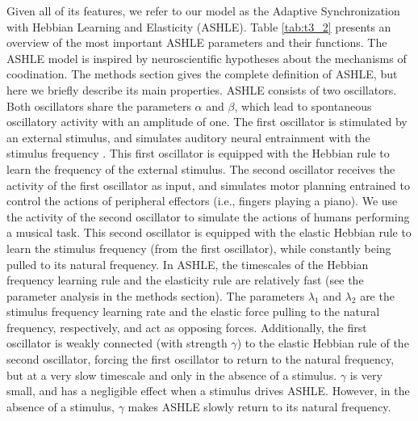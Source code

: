 \documentclass{report}
\begin{document}
Given all of its features, we refer to our model as the Adaptive Synchronization with Hebbian Learning and Elasticity (ASHLE). Table \ref{tab:t3_2} presents an overview of the most important ASHLE parameters and their functions. The ASHLE model is inspired by neuroscientific hypotheses about the mechanisms of coodination. The methods section gives the complete definition of ASHLE, but here we briefly describe its main properties. ASHLE consists of two oscillators. Both oscillators share the parameters $\alpha$ and $\beta$, which lead to spontaneous oscillatory activity with an amplitude of one. The first oscillator is stimulated by an external stimulus, and simulates auditory neural entrainment with the stimulus frequency \cite{large2015neural, patel2014evolutionary, daly2014changes, grahn2009feeling, grahn2013finding}. This first oscillator is equipped with the Hebbian rule to learn the frequency of the external stimulus. The second oscillator receives the activity of the first oscillator as input, and simulates motor planning entrained to control the actions of peripheral effectors (i.e., fingers playing a piano). We use the activity of the second oscillator to simulate the actions of humans performing a musical task. This second oscillator is equipped with the elastic Hebbian rule to learn the stimulus frequency (from the first oscillator), while constantly being pulled to its natural frequency. In ASHLE, the timescales of the Hebbian frequency learning rule and the elasticity rule are relatively fast (see the parameter analysis in the methods section). The parameters $\lambda_1$ and $\lambda_2$ are the stimulus frequency learning rate and the elastic force pulling to the natural frequency, respectively, and act as opposing forces. Additionally, the first oscillator is weakly connected (with strength $\gamma$) to the elastic Hebbian rule of the second oscillator, forcing the first oscillator to return to the natural frequency, but at a very slow timescale and only in the absence of a stimulus. $\gamma$ is very small, and has a negligible effect when a stimulus drives ASHLE. However, in the absence of a stimulus, $\gamma$ makes ASHLE slowly return to its natural frequency. 
\end{document}
